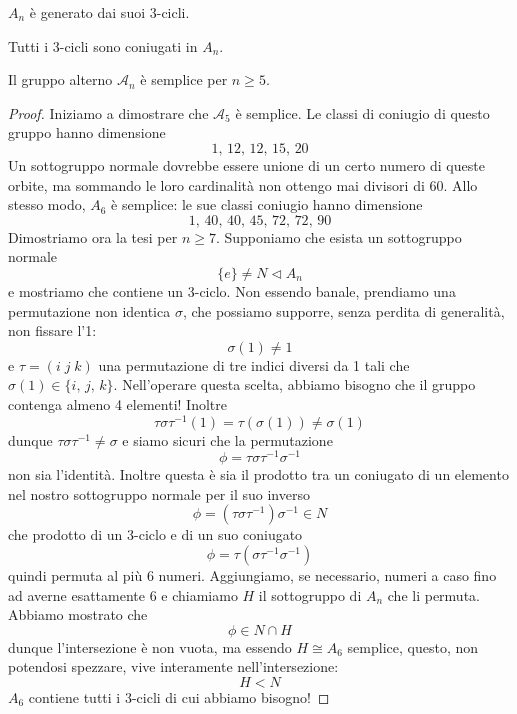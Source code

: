\begin{multicols}{2}
\begin{remark}
	$ A_n $ è generato dai suoi 3-cicli.
\end{remark}
\begin{remark}
	Tutti i 3-cicli sono coniugati in $ A_n $.
\end{remark}
\begin{theorem}
	Il gruppo alterno $ \mathcal{A}_n $ è semplice per $ n \geq 5 $.
\end{theorem}
\begin{proof}
	Iniziamo a dimostrare che $ \mathcal{A}_5 $ è semplice. Le classi di coniugio di questo gruppo hanno dimensione \[1,\, 12,\, 12,\, 15,\, 20\] Un sottogruppo normale dovrebbe essere unione di un certo numero di queste orbite, ma sommando le loro cardinalità non ottengo mai divisori di 60. Allo stesso modo, $ A_6 $ è semplice: le sue classi coniugio hanno dimensione
	\[ 1,\, 40,\, 40,\, 45,\, 72,\, 72,\, 90 \]
	Dimostriamo ora la tesi per $ n \geq 7 $. Supponiamo che esista un sottogruppo normale
	\[ \{e\} \neq N \lhd A_n \]
	e mostriamo che contiene un 3-ciclo. Non essendo banale, prendiamo una permutazione non identica $ \sigma $, che possiamo supporre, senza perdita di generalità, non fissare l'1:
	$$  \sigma(1) \neq 1  $$ 
	e $ \tau = (i\; j\; k) $ una permutazione di tre indici diversi da 1 tali che $ \sigma(1) \in \{i,\, j,\, k\} $. Nell'operare questa scelta, abbiamo bisogno che il gruppo contenga almeno 4 elementi! Inoltre
	\[ \tau\sigma\tau^{-1}(1) = \tau(\sigma(1)) \neq \sigma(1) \]
	dunque $ \tau\sigma\tau^{-1} \neq \sigma $ e siamo sicuri che la permutazione
	\[ \phi = \tau\sigma\tau^{-1}\sigma^{-1} \]
	non sia l'identità. Inoltre questa è sia il prodotto tra un coniugato di un elemento nel nostro sottogruppo normale per il suo inverso 
	\[ \phi = (\tau\sigma\tau^{-1})\sigma^{-1} \in N  \]
	che prodotto di un 3-ciclo e di un suo coniugato
	\[ \phi = \tau(\sigma\tau^{-1}\sigma^{-1}) \]
	quindi permuta al più $ 6 $ numeri. Aggiungiamo, se necessario, numeri a caso fino ad averne esattamente 6 e chiamiamo $ H $ il sottogruppo di $ A_n $ che li permuta. Abbiamo mostrato che
	\[ \phi \in N \cap H \]
	dunque l'intersezione è non vuota, ma essendo $ H \cong A_6 $ semplice, questo, non potendosi spezzare, vive interamente nell'intersezione: \[ H < N \] 
	$ A_6 $ contiene tutti i 3-cicli di cui abbiamo bisogno!
\end{proof}


\end{multicols}
